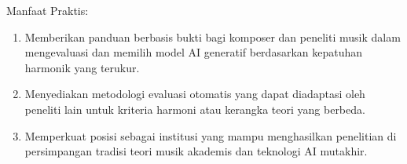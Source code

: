 Manfaat Praktis:
\begin{enumerate}
    \item Memberikan panduan berbasis bukti bagi komposer dan peneliti musik dalam mengevaluasi dan memilih model AI generatif berdasarkan kepatuhan harmonik yang terukur.
    \item Menyediakan metodologi evaluasi otomatis yang dapat diadaptasi oleh peneliti lain untuk kriteria harmoni atau kerangka teori yang berbeda.
    \item Memperkuat posisi \programstudy{} \institutionname{} sebagai institusi yang mampu menghasilkan penelitian di persimpangan tradisi teori musik akademis dan teknologi AI mutakhir.
\end{enumerate}
